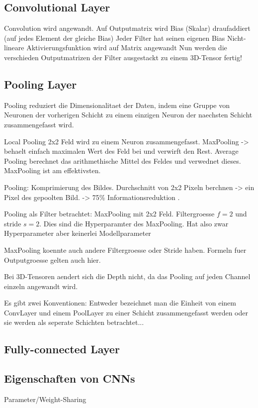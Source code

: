 \subsection{Convolutional Layer}
Convolution wird angewandt.
Auf Outputmatrix wird Bias (Skalar) draufaddiert (auf jedes Element der gleiche Bias)
Jeder Filter hat seinen eigenen Bias
Nicht-lineare Aktivierungsfunktion wird auf Matrix angewandt
Nun werden die verschieden Outputmatrizen der Filter ausgestackt zu einem
3D-Tensor
fertig!

\subsection{Pooling Layer}
Pooling reduziert die Dimensionalitaet der Daten, indem eine Gruppe von Neuronen
der vorherigen Schicht zu einem einzigen Neuron der naechsten Schicht
zusammengefasst wird.

Local Pooling 2x2 Feld wird zu einem Neuron zusammengefasst. MaxPooling ->
behaelt einfach maximalen Wert des Feld bei und verwirft den Rest. Average
Pooling berechnet das arithmethische Mittel des Feldes und verwednet dieses.
MaxPooling ist am effektivsten.

Pooling:
Komprimierung des Bildes. Durchschnitt von 2x2 Pixeln berchnen -> ein Pixel des
gepoolten Bild. -> 75\% Informationsreduktion .

Pooling als Filter betrachtet:
MaxPooling mit 2x2 Feld. Filtergroesse $f=2$ und stride $s=2$. Dies sind die
Hyperparamter des MaxPooling. Hat also zwar Hyperparameter aber keinerlei Modellparameter

MaxPooling koennte auch andere Filtergroesse oder Stride haben. Formeln fuer
Outputgroesse gelten auch hier.

Bei 3D-Tensoren aendert sich die Depth nicht, da das Pooling auf jeden Channel
einzeln angewandt wird.


Es gibt zwei Konventionen:
Entweder bezeichnet man die Einheit von einem ConvLayer und einem PoolLayer zu
einer Schicht zusammengefasst werden oder sie werden als seperate Schichten betrachtet...

\subsection{Fully-connected Layer}

\subsection{Eigenschaften von CNNs}
Parameter/Weight-Sharing

